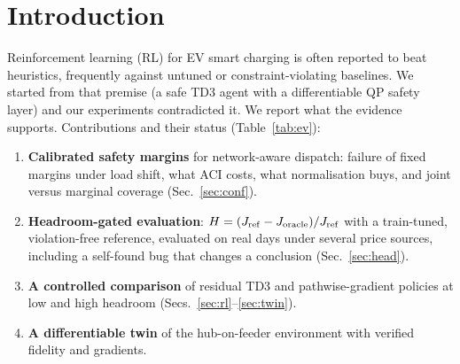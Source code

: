 \documentclass[10pt]{article}
\begin{document}
\section{Introduction}
Reinforcement learning (RL) for EV smart charging is often reported to beat heuristics, frequently against untuned or constraint-violating baselines.
We started from that premise (a safe TD3 agent with a differentiable QP safety layer) and our experiments contradicted it. We report what the evidence supports.
Contributions and their status (Table~\ref{tab:ev}):
\begin{enumerate}
\item \textbf{Calibrated safety margins} for network-aware dispatch: failure of fixed margins under load shift, what ACI costs, what normalisation buys, and joint versus marginal coverage (Sec.~\ref{sec:conf}).
\item \textbf{Headroom-gated evaluation}: $H=(J_{\rm ref}-J_{\rm oracle})/J_{\rm ref}$ with a train-tuned, violation-free reference, evaluated on real days under several price sources, including a self-found bug that changes a conclusion (Sec.~\ref{sec:head}).
\item \textbf{A controlled comparison} of residual TD3 and pathwise-gradient policies at low and high headroom (Secs.~\ref{sec:rl}--\ref{sec:twin}).
\item \textbf{A differentiable twin} of the hub-on-feeder environment with verified fidelity and gradients.
\end{enumerate}
\begin{table}[h]\centering\small
{}\caption{Claims and how far each is supported.}\label{tab:ev}\end{table}
\end{document}
